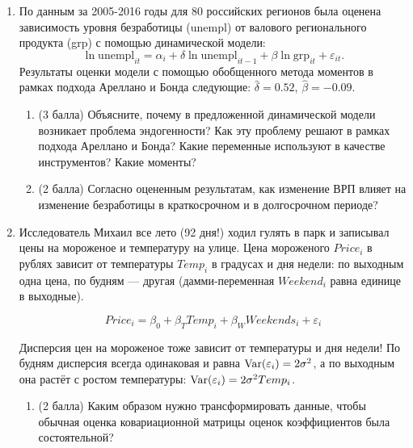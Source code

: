 \begin{enumerate}
\item 
По данным за 2005-2016 годы для 80 российских регионов была оценена зависимость уровня безработицы (unempl) от валового регионального продукта (grp) с помощью динамической модели:
\[
\ln \text{unempl}_{it}= \alpha_i + \delta \ln \text{unempl}_{it-1} + \beta \ln \text{grp}_{it} + \varepsilon_{it}.
\]
Результаты оценки модели с помощью обобщенного метода моментов в рамках подхода Ареллано и Бонда следующие: 
$\hat\delta = 0.52$, $\hat \beta = -0.09$.



 \begin{enumerate}
\item 	(3 балла) Объясните, почему в предложенной динамической модели возникает проблема эндогенности? 
Как эту проблему решают в рамках подхода Ареллано и Бонда? 
Какие переменные используют в качестве инструментов? 
Какие моменты?
\item (2 балла) Согласно оцененным результатам, как изменение ВРП влияет на изменение безработицы в краткосрочном и в долгосрочном периоде?
\end{enumerate}



\item 
Исследователь Михаил все лето (92 дня!) ходил гулять в парк и записывал цены на мороженое и температуру на улице. 
Цена мороженого $Price_i$ в рублях зависит от температуры $Temp_i$ в градусах и дня недели: по выходным одна цена, по будням — другая (дамми-переменная $Weekend_i$ равна единице в выходные).

\[
Price_i = \beta_0 + \beta_{T} Temp_i + \beta_{W} Weekends_i + \varepsilon_i
\]

Дисперсия цен на мороженое тоже зависит от температуры и дня недели! 
По будням дисперсия всегда одинаковая и равна $\operatorname{Var}(\varepsilon_i) = 2\sigma^2$, а по выходным она растёт с ростом температуры: $\operatorname{Var}(\varepsilon_i) = 2 \sigma^2 Temp_i$. 

\begin{enumerate} 


\item (2 балла) Каким образом нужно трансформировать данные, чтобы обычная оценка ковариационной матрицы оценок коэффициентов была состоятельной?



\end{enumerate}
\end{enumerate}
